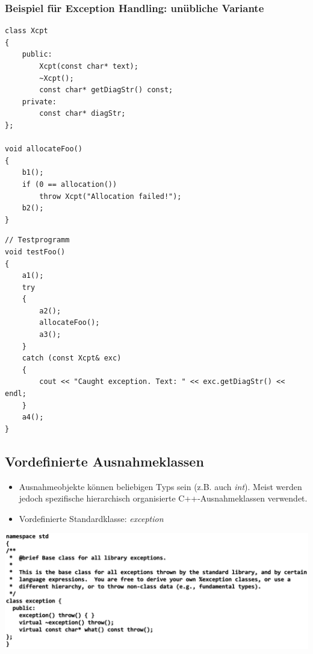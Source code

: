 \subsubsection{Beispiel für Exception Handling: unübliche Variante}
\vspace{-\baselineskip}
\begin{multicols}{2}
\begin{minipage}{\linewidth}
\begin{lstlisting}
class Xcpt
{
	public:
		Xcpt(const char* text);
		~Xcpt();
		const char* getDiagStr() const;
	private:
		const char* diagStr;
};

void allocateFoo()
{
	b1();
	if (0 == allocation())
		throw Xcpt("Allocation failed!");
	b2();
}
\end{lstlisting}
\end{minipage}
\begin{minipage}{\linewidth}
\begin{lstlisting}
// Testprogramm
void testFoo()
{
	a1();
	try
	{
		a2();
		allocateFoo();
		a3();
	}
	catch (const Xcpt& exc)
	{
		cout << "Caught exception. Text: " << exc.getDiagStr() << endl;
	}
	a4();
}
\end{lstlisting}
\end{minipage}
\end{multicols}

\begin{multicols}{2}
\subsection{Vordefinierte Ausnahmeklassen}
\begin{itemize}
	\item Ausnahmeobjekte können beliebigen Typs sein (z.B. auch \emph{int}). Meist werden jedoch spezifische hierarchisch organisierte C++-Ausnahmeklassen verwendet.
	\item Vordefinierte Standardklasse: \emph{exception}
\end{itemize}
\includegraphics[width=\linewidth]{images/exceptionClass.png}
\end{multicols}

